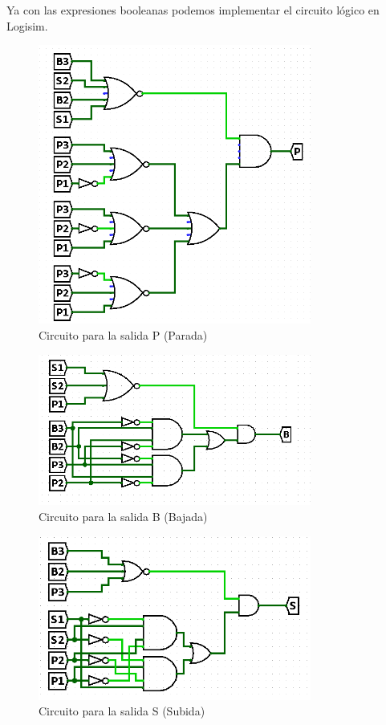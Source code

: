 Ya con las expresiones booleanas podemos implementar el circuito lógico en Logisim. 

\begin{figure}[H]
    \centering
    \includegraphics[width=0.8\textwidth]{Salida P.png}
    \caption{Circuito para la salida P (Parada)}
\end{figure}

\begin{figure}[H]
    \centering
    \includegraphics[width=0.8\textwidth]{Salida B.png}
    \caption{Circuito para la salida B (Bajada)}
\end{figure}

\begin{figure}[H]
    \centering
    \includegraphics[width=0.8\textwidth]{Salida S.png}
    \caption{Circuito para la salida S (Subida)}

\end{figure}

